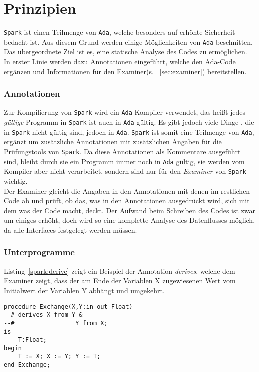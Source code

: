 \section{Prinzipien}
\label{sec:Prinzipien}
\texttt{Spark} ist einen Teilmenge von \texttt{Ada}, welche besonders auf erhöhte Sicherheit bedacht ist. Aus diesem Grund werden einige Möglichkeiten von \texttt{Ada} beschnitten. Das übergeordnete Ziel ist es, eine statische Analyse des Codes zu ermöglichen. In erster Linie werden dazu Annotationen eingeführt, welche den Ada-Code ergänzen und Informationen für den Examiner(s. ~\ref{sec:examiner}) bereitstellen.

\subsubsection{Annotationen}
\label{subsubsec:Annotationen}
Zur Kompilierung von \texttt{Spark} wird ein \texttt{Ada}-Kompiler verwendet, das heißt jedes \textit{gültige} Programm in \texttt{Spark} ist auch in \texttt{Ada} gültig. Es gibt jedoch viele Dinge , die in \texttt{Spark} nicht gültig sind, jedoch in \texttt{Ada}. \texttt{Spark} ist somit eine Teilmenge von \texttt{Ada}, ergänzt um zusätzliche Annotationen mit zusätzlichen Angaben für die Prüfungstools von \texttt{Spark}. Da diese Annotationen als Kommentare ausgeführt sind, bleibt durch sie ein Programm immer noch in \texttt{Ada} gültig, sie werden vom Kompiler aber nicht verarbeitet, sondern sind nur für den \textit{Examiner} von \texttt{Spark} wichtig.\\
Der Examiner gleicht die Angaben in den Annotationen mit denen im restlichen Code ab und prüft, ob das, was in den Annotationen ausgedrückt wird, sich mit dem was der Code macht, deckt. Der Aufwand beim Schreiben des Codes ist zwar um einiges erhöht, doch wird so eine komplette Analyse des Datenflusses möglich, da alle Interfaces festgelegt werden müssen.
\subsubsection{Unterprogramme}
\label{subsubsec:Unterprogramme}

Listing~\ref{spark:derive} zeigt ein Beispiel der Annotation \textit{derives}, welche dem Examiner zeigt, dass der am Ende der Variablen X zugewiesenen Wert vom Initialwert der Variablen Y abhängt und umgekehrt.
\begin{lstlisting}[caption={derive Beispiel}, label=spark:derive]
procedure Exchange(X,Y:in out Float)
--# derives X from Y &
--# 				Y from X;
is
	T:Float;
begin
	T := X; X := Y; Y := T;
end Exchange;
\end{lstlisting}

